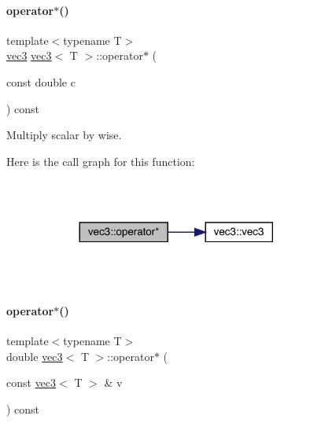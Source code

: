 \mbox{\label{structvec3_a0f446233cd7b3fe50bc3d773c85177d5}} 
\paragraph{\texorpdfstring{operator$\ast$()}{operator*()}\hspace{0.1cm}{\footnotesize\ttfamily [1/2]}}
{\footnotesize\ttfamily template$<$typename T$>$ \\
\mbox{\hyperlink{structvec3}{vec3}} \mbox{\hyperlink{structvec3}{vec3}}$<$ T $>$\+::operator$\ast$ (\begin{DoxyParamCaption}\item[{const double}]{c }\end{DoxyParamCaption}) const\hspace{0.3cm}{\ttfamily [inline]}}



Multiply scalar by wise. 

Here is the call graph for this function\+:\nopagebreak
\begin{figure}[H]
\begin{center}
\leavevmode
\includegraphics[width=264pt]{structvec3_a0f446233cd7b3fe50bc3d773c85177d5_cgraph}
\end{center}
\end{figure}
\mbox{\label{structvec3_adf6b983e98aca9730b8cabce92a8affd}} 
\paragraph{\texorpdfstring{operator$\ast$()}{operator*()}\hspace{0.1cm}{\footnotesize\ttfamily [2/2]}}
{\footnotesize\ttfamily template$<$typename T$>$ \\
double \mbox{\hyperlink{structvec3}{vec3}}$<$ T $>$\+::operator$\ast$ (\begin{DoxyParamCaption}\item[{const \mbox{\hyperlink{structvec3}{vec3}}$<$ T $>$ \&}]{v }\end{DoxyParamCaption}) const\hspace{0.3cm}{\ttfamily [inline]}}



